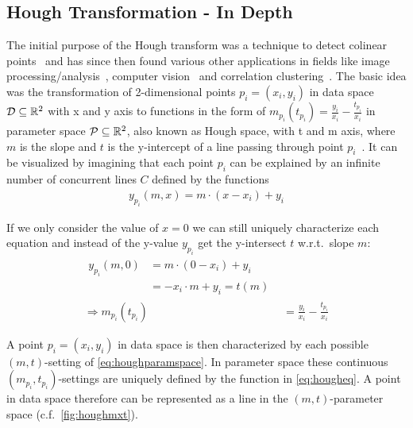 \subsection{Hough Transformation - In Depth}\label{ssec:houghindepth}
The initial purpose of the Hough transform was a technique to detect colinear points~\cite{houghOriginal1962method} and has since then found various other applications in fields like image processing/analysis~\cite{rosenfeld1969picture,ballard1981generalizing}, computer vision~\cite{davies2004machine} and correlation clustering~\cite{CASHachtert2008robust}.
The basic idea was the transformation of 2-dimensional points $p_i = (x_i,y_i)$ in data space $\mathcal{D} \subseteq \mathbb{R}^2$ with x and y axis to functions in the form of ${m_{p_i}(t_{p_i}) = \frac{y_i}{x_i} - \frac{t_{p_i}}{x_i}}$ in parameter space $\mathcal{P} \subseteq \mathbb{R}^2$, also known as Hough space, with t and m axis, where $m$ is the slope and $t$ is the y-intercept of a line passing through point $p_i$~\cite{illingworth1988survey}. It can be visualized by imagining that each point $p_i$ can be explained by an infinite number of concurrent lines $C$ defined by the functions 
\begin{align}
    {y_{p_i}(m,x) = m \cdot (x - x_i) + y_i}
\end{align}

If we only consider the value of $x=0$ we can still uniquely characterize each equation and instead of the y-value $y_{p_i}$ get the y-intersect $t$ w.r.t.\ slope $m$:
\begin{align}\label{eq:houghparamspace}
\begin{split}
y_{p_i}(m,0) 
&= m \cdot (0 - x_i) + y_i\\
&= -x_i \cdot m + y_i = t(m)
\end{split}\\
\label{eq:hougheq}
\Rightarrow m_{p_i}(t_{p_i}) &= \frac{y_i}{x_i} - \frac{t_{p_i}}{x_i}
\end{align}

A point $p_i = (x_i, y_i)$ in data space is then characterized by each possible $(m,t)$-setting of \autoref{eq:houghparamspace}. In parameter space these continuous $(m_{p_i},t_{p_i})$-settings are uniquely defined by the function in \autoref{eq:hougheq}. A point in data space therefore can be represented as a line in the $(m,t)$-parameter space (c.f.\ \autoref{fig:houghmxt}).  %

